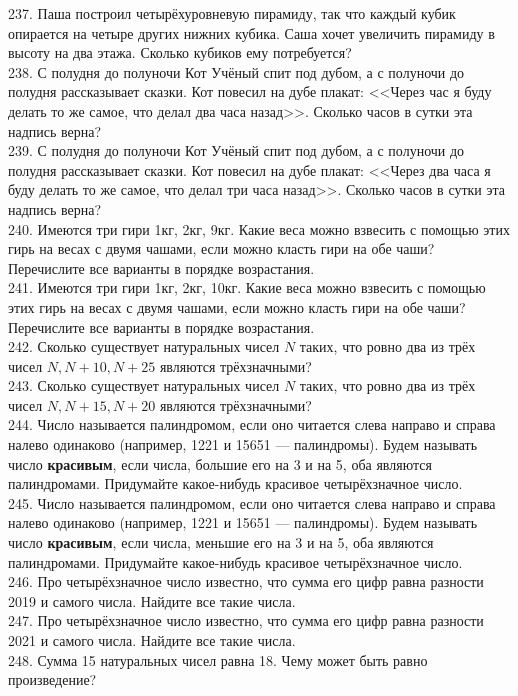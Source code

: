 237. Паша построил четырёхуровневую пирамиду, так что каждый кубик опирается на четыре других нижних кубика. Саша хочет увеличить пирамиду в высоту на два этажа. Сколько кубиков ему потребуется?\\
238. С полудня до полуночи Кот Учёный спит под дубом, а с полуночи до полудня рассказывает сказки. Кот повесил на дубе плакат: <<Через час я буду делать то же самое, что делал два часа назад>>. Сколько часов в сутки эта надпись верна?\\
239. С полудня до полуночи Кот Учёный спит под дубом, а с полуночи до полудня рассказывает сказки. Кот повесил на дубе плакат: <<Через два часа я буду делать то же самое, что делал три часа назад>>. Сколько часов в сутки эта надпись верна?\\
240. Имеются три гири 1кг, 2кг, 9кг. Какие веса можно взвесить с помощью этих гирь на весах с двумя чашами, если можно класть гири на обе чаши? Перечислите все варианты в порядке возрастания.\\
241. Имеются три гири 1кг, 2кг, 10кг. Какие веса можно взвесить с помощью этих гирь на весах с двумя чашами, если можно класть гири на обе чаши? Перечислите все варианты в порядке возрастания.\\
242. Сколько существует натуральных чисел $N$ таких, что ровно два из трёх чисел $N, N+10, N+25$ являются трёхзначными?\\
243. Сколько существует натуральных чисел $N$ таких, что ровно два из трёх чисел $N, N+15, N+20$ являются трёхзначными?\\
244. Число называется палиндромом, если оно читается слева направо и справа налево одинаково (например, 1221 и 15651 --- палиндромы). Будем называть число {\bf красивым}, если числа, большие его на 3 и на 5, оба являются палиндромами. Придумайте какое-нибудь красивое четырёхзначное число.\\
245. Число называется палиндромом, если оно читается слева направо и справа налево одинаково (например, 1221 и 15651 --- палиндромы). Будем называть число {\bf красивым}, если числа, меньшие его на 3 и на 5, оба являются палиндромами. Придумайте какое-нибудь красивое четырёхзначное число.\\
246. Про четырёхзначное число известно, что сумма его цифр равна разности 2019 и самого числа. Найдите все такие числа.\\
247. Про четырёхзначное число известно, что сумма его цифр равна разности 2021 и самого числа. Найдите все такие числа.\\
248. Сумма 15 натуральных чисел равна 18. Чему может быть равно произведение?\\
